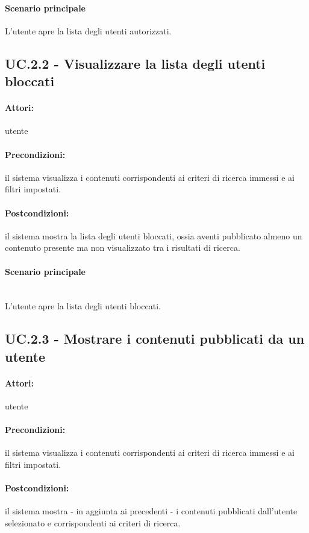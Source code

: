 \documentclass[10pt,a4paper,headinclude,footinclude,hidelinks]{scrreprt} %
\begin{document}
	\paragraph{Scenario principale}
	L'utente apre la lista degli utenti autorizzati.

	\subsection[UC.2.2]{UC.2.2 - Visualizzare la lista degli utenti bloccati}
	\label{sec:stage:ar:uc:2_2}
	\paragraph{Attori:} utente
	\paragraph{Precondizioni:} il sistema visualizza i contenuti corrispondenti ai criteri di ricerca immessi e ai filtri impostati.
	\paragraph{Postcondizioni:} il sistema mostra la lista degli utenti bloccati, ossia aventi pubblicato almeno un contenuto presente ma non visualizzato tra i risultati di ricerca.
	\paragraph{Scenario principale} \hfill \\
	L'utente apre la lista degli utenti bloccati.

	\subsection[UC.2.3]{UC.2.3 - Mostrare i contenuti pubblicati da un utente}
	\label{sec:stage:ar:uc:2_3}
	\paragraph{Attori:} utente
	\paragraph{Precondizioni:} il sistema visualizza i contenuti corrispondenti ai criteri di ricerca immessi e ai filtri impostati.
	\paragraph{Postcondizioni:} il sistema mostra - in aggiunta ai precedenti - i contenuti pubblicati dall'utente selezionato e corrispondenti ai criteri di ricerca.
\end{document}
